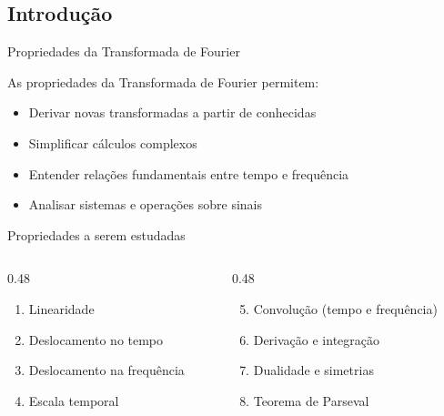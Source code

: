 
\subsection{Introdução}

\begin{frame}{Propriedades da Transformada de Fourier}

As propriedades da Transformada de Fourier permitem:

\begin{itemize}
\item Derivar novas transformadas a partir de conhecidas
\item Simplificar cálculos complexos
\item Entender relações fundamentais entre tempo e frequência
\item Analisar sistemas e operações sobre sinais
\end{itemize}

\end{frame}


\begin{frame}{Propriedades a serem estudadas}

\begin{columns}
\begin{column}{0.48\textwidth}
\begin{enumerate}
\item Linearidade
\item Deslocamento no tempo
\item Deslocamento na frequência
\item Escala temporal
\end{enumerate}
\end{column}
\begin{column}{0.48\textwidth}
\begin{enumerate}
\setcounter{enumi}{4}
\item Convolução (tempo e frequência)
\item Derivação e integração
\item Dualidade e simetrias
\item Teorema de Parseval
\end{enumerate}
\end{column}
\end{columns}

\end{frame}

